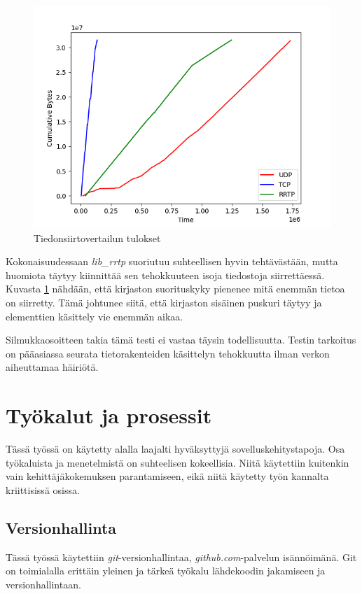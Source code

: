 \documentclass[a4paper,12pt]{article}
\begin{document}
    \begin{figure}[h!]
        \centering
        \includegraphics[width=\textwidth]{doc/latex/src/images/plot.png}
        \caption{Tiedonsiirtovertailun tulokset}
        \label{fig:performance}
    \end{figure}

    
Kokonaisuudessaan \textit{lib\_rrtp} suoriutuu suhteellisen hyvin tehtävästään, mutta huomiota täytyy kiinnittää sen tehokkuuteen isoja tiedostoja siirrettäessä. Kuvasta \ref{fig:performance} nähdään, että kirjaston suorituskyky pienenee mitä enemmän tietoa on siirretty. Tämä johtunee siitä, että kirjaston sisäinen puskuri täytyy ja elementtien käsittely vie enemmän aikaa.



Silmukkaosoitteen takia tämä testi ei vastaa täysin todellisuutta.
Testin tarkoitus on pääasiassa seurata tietorakenteiden käsittelyn tehokkuutta ilman
verkon aiheuttamaa häiriötä.


    \section{Työkalut ja prosessit}
    Tässä työssä on käytetty alalla laajalti hyväksyttyjä sovelluskehitystapoja. Osa työkaluista ja menetelmistä on suhteelisen kokeellisia. Niitä käytettiin kuitenkin vain kehittäjäkokemuksen parantamiseen, eikä niitä käytetty työn kannalta kriittisissä osissa.

    \subsection{Versionhallinta}
    Tässä työssä käytettiin \textit{git}-versionhallintaa, \textit{github.com}-palvelun isännöimänä. Git on toimialalla erittäin yleinen ja tärkeä työkalu lähdekoodin jakamiseen ja versionhallintaan. \par
\end{document}
